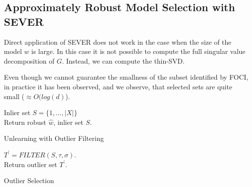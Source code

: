\subsection{Approximately Robust Model Selection with SEVER}

Direct application of SEVER does not work in the case when the size of the model $w$ is large. In this case it is not possible to compute the full singular value decomposition of $G$. Instead, we can compute the thin-SVD.


Even though we cannot guarantee the smallness of the subset identified by FOCI, in practice it has been observed, and we observe, that selected sets are quite small ($\approx O(log(d)$). 


\begin{algorithm}
\SetAlgoLined
{}
Inlier set $S = \{1,\ldots,|X|\}$ \\
Return robust $\hat{w}$, inlier set $S$.
 \caption{Unlearning with Outlier Filtering}
\end{algorithm}

\begin{algorithm}
\SetAlgoLined
{}
   $T^\prime = FILTER(S, \tau, \sigma)$.  \\
Return outlier set $T^\prime$.
 \caption{Outlier Selection}
\end{algorithm}

